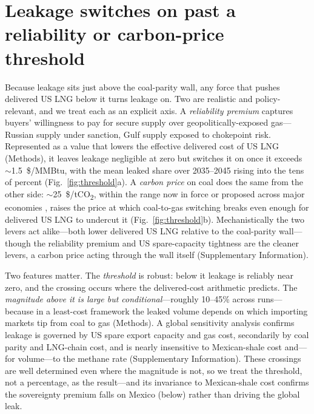 \documentclass[sn-nature]{sn-jnl}
\theoremstyle{thmstyleone}%
\theoremstyle{thmstyletwo}%
\theoremstyle{thmstylethree}%
\begin{document}
\section*{Leakage switches on past a reliability or carbon-price threshold}
Because leakage sits just above the coal-parity wall, any force that pushes
delivered US LNG below it turns leakage on. Two are realistic and
policy-relevant, and we treat each as an explicit axis. A \emph{reliability
premium} captures buyers' willingness to pay for secure supply over
geopolitically-exposed gas---Russian supply under sanction, Gulf supply exposed
to chokepoint risk. Represented as a value that lowers the effective delivered
cost of US LNG (Methods), it leaves leakage negligible at zero but switches it
on once it exceeds $\sim$1.5~\$/MMBtu, with the mean leaked share over 2035--2045
rising into the tens of percent (Fig.~\ref{fig:threshold}a). A \emph{carbon
price} on coal does the same from the other side: $\sim$25~\$/tCO\textsubscript{2},
within the range now in force or proposed across major economies
\citep{worldbank_carbon2023, Nordhaus2015}, raises the price at which
coal-to-gas switching breaks even enough for delivered US LNG to undercut it
(Fig.~\ref{fig:threshold}b). Mechanistically the two levers act alike---both
lower delivered US LNG relative to the coal-parity wall---though the reliability
premium and US spare-capacity tightness are the cleaner levers, a carbon price
acting through the wall itself (Supplementary Information).

Two features matter. The \emph{threshold} is robust: below it leakage is
reliably near zero, and the crossing occurs where the delivered-cost arithmetic
predicts. The \emph{magnitude above it is large but conditional}---roughly
10--45\% across runs---because in a least-cost framework the leaked volume
depends on which importing markets tip from coal to gas (Methods). A global
sensitivity analysis confirms leakage is governed by US spare export
capacity and gas cost, secondarily by coal parity and LNG-chain cost, and is
nearly insensitive to Mexican-shale cost and---for volume---to the methane rate
(Supplementary Information). These crossings are
well determined even where the magnitude is not, so we treat the threshold, not
a percentage, as the result---and its invariance to Mexican-shale cost confirms
the sovereignty premium falls on Mexico (below) rather than driving the global
leak.
\end{document}

